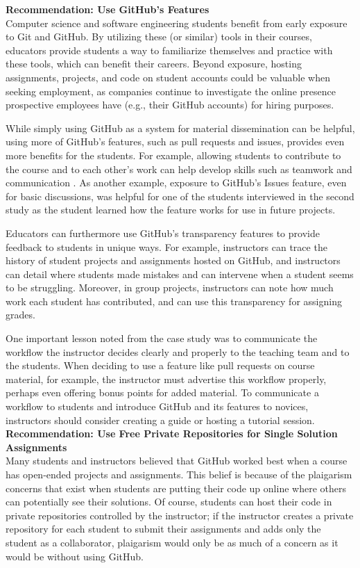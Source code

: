 \textbf{Recommendation: Use GitHub's Features} \\
Computer science and software engineering students benefit from early exposure to Git and GitHub. By utilizing these (or similar) tools in their courses, educators provide students a way to familiarize themselves and practice with these tools, which can benefit their careers. Beyond exposure, hosting assignments, projects, and code on student accounts could be valuable when seeking employment, as companies continue to investigate the online presence prospective employees have (e.g., their GitHub accounts) for hiring purposes.

While simply using GitHub as a system for material dissemination can be helpful, using more of GitHub's features, such as pull requests and issues, provides even more benefits for the students. For example, allowing students to contribute to the course and to each other's work can help develop skills such as teamwork and communication \cite{hamer2006some}. As another example, exposure to GitHub's Issues feature, even for basic discussions, was helpful for one of the students interviewed in the second study as the student learned how the feature works for use in future projects.

Educators can furthermore use GitHub's transparency features to provide feedback to students in unique ways. For example, instructors can trace the history of student projects and assignments hosted on GitHub, and instructors can detail where students made mistakes and can intervene when a student seems to be struggling. Moreover, in group projects, instructors can note how much work each student has contributed, and can use this transparency for assigning grades.

One important lesson noted from the case study was to communicate the workflow the instructor decides clearly and properly to the teaching team and to the students. When deciding to use a feature like pull requests on course material, for example, the instructor must advertise this workflow properly, perhaps even offering bonus points for added material. To communicate a workflow to students and introduce GitHub and its features to novices, instructors should consider creating a guide or hosting a tutorial session. \\


\textbf{Recommendation: Use Free Private Repositories for Single Solution Assignments} \\
Many students and instructors believed that GitHub worked best when a course has open-ended projects and assignments. This belief is because of the plaigarism concerns that exist when students are putting their code up online where others can potentially see their solutions. Of course, students can host their code in private repositories controlled by the instructor; if the instructor creates a private repository for each student to submit their assignments and adds only the student as a collaborator, plaigarism would only be as much of a concern as it would be without using GitHub.

